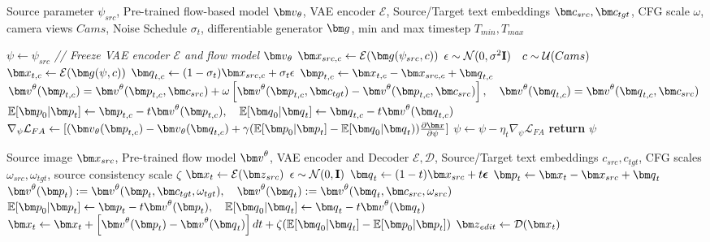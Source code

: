 \begin{algorithm}[t]
\caption{Algorithm of FlowAlign for 3D editing}\label{alg:method_3d}
\begin{algorithmic}[1]

\Require Source parameter $\psi_{src}$, Pre-trained flow-based model $\vv_\theta$, VAE encoder $\mathcal{E}$, Source/Target text embeddings $\vc_{src}, \vc_{tgt}$, CFG scale $\omega$, camera views $Cams$, Noise Schedule $\sigma_t$, differentiable generator $\vg$, min and max timestep $T_{min}, T_{max}$ 

\State $\psi \gets \psi_{src}$
\State \textit{// Freeze VAE encoder $\mathcal{E}$ and flow model $\vv_\theta$}
\State $\vx_{src,c} \gets \mathcal{E}(\vg(\psi_{src},c))$
    \State $\epsilon \sim \mathcal{N}(0, \sigma^2 {\mathbf{I}}) \quad c\sim \mathcal{U}(Cams)$
    \State $\vx_{t,c} \gets \mathcal{E}(\vg(\psi,c))$
    \State $\vq_{t,c} \gets (1-\sigma_t) \vx_{src,c} + \sigma_t \epsilon$
    \State $\vp_{t,c} \gets \vx_{t,c} - \vx_{src,c} + \vq_{t,c}$
    \State $\vv^\theta(\vp_{t,c}) = \vv^\theta(\vp_{t,c}, \vc_{src}) + \omega\left[\vv^\theta(\vp_{t,c}, \vc_{tgt}) - \vv^\theta(\vp_{t,c}, \vc_{src})\right], \quad\vv^\theta(\vq_{t,c}) = \vv^\theta(\vq_{t,c}, \vc_{src})$
    \State $\mathbb{E}[\vp_0|\vp_t] \gets \vp_{t,c} - t \vv^\theta(\vp_{t,c}), \quad \mathbb{E}[\vq_0|\vq_t] \gets \vq_{t,c} - t \vv^\theta(\vq_{t,c})$
    \State $\nabla_\psi \mathcal{L}_{FA} \gets [(\vv_\theta(\vp_{t,c}) - \vv_\theta(\vq_{t,c}) + 
    \gamma
    (\mathbb{E}[\vp_0|\vp_t]-\mathbb{E}[\vq_0|\vq_t)){\frac{\partial \vx}{\partial \psi}}]$
    \State $\psi \gets \psi - \eta_t \nabla_\psi \mathcal{L}_{FA}$
\EndFor
\State \textbf{return} $\psi$
\end{algorithmic}
\end{algorithm}

\begin{algorithm}[!t]
\caption{Algorithm of FlowAlign with FLUX (Guidance distilled model)}\label{alg:method_flux}
\begin{algorithmic}[1]
\Require Source image $\vx_{src}$, Pre-trained flow model $\vv^\theta$, VAE encoder and Decoder $\mathcal{E}, \mathcal{D}$, 
Source/Target text embeddings $c_{src}, c_{tgt}$, CFG scales $\omega_{src}, \omega_{tgt}$, source consistency scale $\zeta$
\State $\vx_t \gets \mathcal{E}(\vz_{src})$
    \State $\epsilon \sim \mathcal{N}(0, {\mathbf{I}})$
    \State $\vq_t \gets (1-t) \vx_{src} + t \epsilonb$
    \State $\vp_t \gets \vx_t - \vx_{src} + \vq_t$
    \State $\vv^\theta(\vp_t) := \vv^\theta(\vp_t, \vc_{tgt}, \omega_{tgt}), \quad \vv^\theta(\vq_t) := \vv^\theta(\vq_t, \vc_{src}, \omega_{src})$
    \State $\mathbb{E}[\vp_0|\vp_t] \gets \vp_t - t \vv^\theta(\vp_t), \quad \mathbb{E}[\vq_0|\vq_t] \gets \vq_t - t \vv^\theta(\vq_t)$
    \State $\vx_t \gets \vx_t + \left[\vv^\theta(\vp_t) - \vv^\theta(\vq_t)\right] dt + \zeta (\mathbb{E}[\vq_0|\vq_t]-\mathbb{E}[\vp_0|\vp_t])$
\EndFor
\State $\vz_{edit} \gets \mathcal{D}(\vx_t)$
\end{algorithmic}
\end{algorithm}

